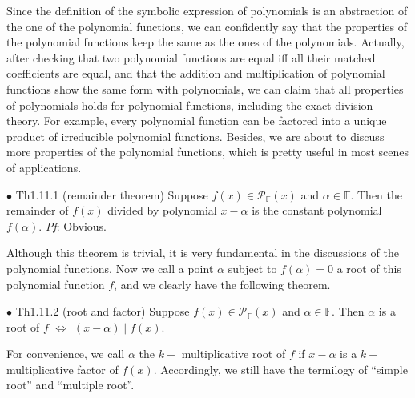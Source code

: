 \documentclass{article}
\begin{document}
\begin{Rmk}{}
    Since the definition of the symbolic expression of polynomials is an abstraction of the one of the polynomial functions, we can confidently say that the properties of the polynomial functions keep the same as the ones of the polynomials. \textcolor{Th}{Actually, after checking that two polynomial functions are equal iff all their matched coefficients are equal, and that the addition and multiplication of polynomial functions show the same form with polynomials, we can claim that all properties of polynomials holds for polynomial functions, including the exact division theory.} For example, every polynomial function can be factored into a unique product of irreducible polynomial functions. Besides, we are about to discuss more properties of the polynomial functions, which is pretty useful in most scenes of applications.
\end{Rmk}

\begin{Th}{$\bullet$ Th1.11.1 (remainder theorem)}
    Suppose $f(x)\in\mathcal{P}_\mathbb{F}(x)$ and $\alpha\in\mathbb{F}$. Then the remainder of $f(x)$ divided by polynomial $x-\alpha$ is the constant polynomial $f(\alpha)$.
    \tcblower
    \textit{Pf}: Obvious.
\end{Th}

\begin{Rmk}{}
    Although this theorem is trivial, it is very fundamental in the discussions of the polynomial functions. \textcolor{Df}{Now we call a point $\alpha$ subject to $f(\alpha)=0$ a root of this polynomial function $f$,} and we clearly have the following theorem.
\end{Rmk}

\begin{Th}{$\bullet$ Th1.11.2 (root and factor)}
    Suppose $f(x)\in\mathcal{P}_\mathbb{F}(x)$ and $\alpha\in\mathbb{F}$. Then $\alpha$ is a root of $f$ $\Leftrightarrow$ $(x-\alpha)\mid f(x)$.
\end{Th}

\begin{Rmk}{}
    For convenience, we call $\alpha$ the $k-$ multiplicative root of $f$ if $x-\alpha$ is a $k-$ multiplicative factor of $f(x)$. Accordingly, we still have the termilogy of ``simple root'' and ``multiple root''.
\end{Rmk}
\end{document}
